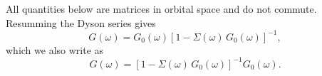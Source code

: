 \documentclass{article}
\begin{document}
All quantities below are matrices in orbital space and do not commute.
Resumming the Dyson series gives
\begin{equation}
G(\omega) = G_0(\omega)\left[1 - \Sigma(\omega)\,G_0(\omega)\right]^{-1} ,
\label{eq:d1}
\end{equation}
which we also write as
\begin{equation}
G(\omega) = \left[1 - \Sigma(\omega)\,G_0(\omega)\right]^{-1} G_0(\omega) .
\label{eq:d2}
\end{equation}
\end{document}
